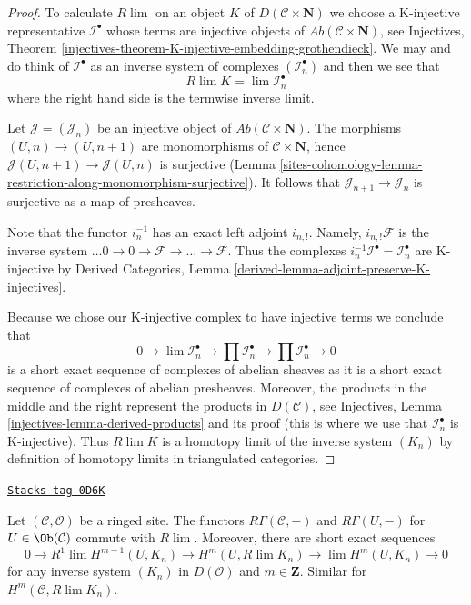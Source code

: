 \begin{proof}
To calculate $R\lim$ on an object $K$ of $D(\mathcal{C} \times \mathbf{N})$
we choose a K-injective representative $\mathcal{I}^\bullet$ whose terms are
injective objects of $\textit{Ab}(\mathcal{C} \times \mathbf{N})$, see
Injectives, Theorem
\ref{injectives-theorem-K-injective-embedding-grothendieck}.
We may and do think of $\mathcal{I}^\bullet$ as an inverse system of
complexes $(\mathcal{I}_n^\bullet)$ and then we see that
$$
R\lim K = \lim \mathcal{I}_n^\bullet
$$
where the right hand side is the termwise inverse limit.

\medskip\noindent
Let $\mathcal{J} = (\mathcal{J}_n)$ be an injective object of
$\textit{Ab}(\mathcal{C} \times \mathbf{N})$. The morphisms
$(U, n) \to (U, n + 1)$ are monomorphisms of
$\mathcal{C} \times \mathbf{N}$, hence
$\mathcal{J}(U, n + 1) \to \mathcal{J}(U, n)$ is surjective
(Lemma \ref{sites-cohomology-lemma-restriction-along-monomorphism-surjective}).
It follows that $\mathcal{J}_{n + 1} \to \mathcal{J}_n$ is
surjective as a map of presheaves.

\medskip\noindent
Note that the functor $i_n^{-1}$ has an exact left adjoint $i_{n, !}$.
Namely, $i_{n, !}\mathcal{F}$ is the inverse system
$\ldots 0 \to 0 \to \mathcal{F} \to \ldots \to \mathcal{F}$.
Thus the complexes $i_n^{-1}\mathcal{I}^\bullet = \mathcal{I}_n^\bullet$
are K-injective by
Derived Categories, Lemma \ref{derived-lemma-adjoint-preserve-K-injectives}.

\medskip\noindent
Because we chose our K-injective complex to have injective terms
we conclude that
$$
0 \to  \lim \mathcal{I}_n^\bullet \to \prod \mathcal{I}_n^\bullet
\to \prod \mathcal{I}_n^\bullet \to 0
$$
is a short exact sequence of complexes of abelian sheaves as it
is a short exact sequence of complexes of abelian presheaves.
Moreover, the products in the middle and the right represent
the products in $D(\mathcal{C})$, see
Injectives, Lemma \ref{injectives-lemma-derived-products} and its
proof (this is where we use that $\mathcal{I}_n^\bullet$ is K-injective).
Thus $R\lim K$ is a homotopy limit of the inverse system $(K_n)$
by definition of homotopy limits in triangulated categories.
\end{proof}

\begin{lemma}
\label{sites-cohomology-lemma-RGamma-commutes-with-Rlim}
\href{https://stacks.math.columbia.edu/tag/0D6K}{\texttt{Stacks tag 0D6K}}

Let $(\mathcal{C}, \mathcal{O})$ be a ringed site. The functors
$R\Gamma(\mathcal{C}, -)$ and $R\Gamma(U, -)$ for $U \in \Ob(\mathcal{C})$
commute with $R\lim$. Moreover, there are
short exact sequences
$$
0 \to
R^1\lim H^{m - 1}(U, K_n) \to H^m(U, R\lim K_n) \to
\lim H^m(U, K_n) \to 0
$$
for any inverse system $(K_n)$ in $D(\mathcal{O})$ and $m \in \mathbf{Z}$.
Similar for $H^m(\mathcal{C}, R\lim K_n)$.
\end{lemma}

